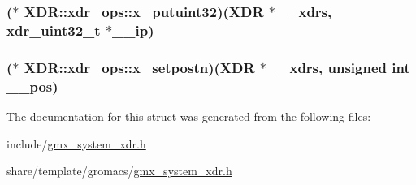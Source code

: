\hypertarget{structXDR_1_1xdr__ops_a5217c37546df602c7707342faa2e8eef}{
\subsubsection[{x\-\_\-putuint32}]{($\ast$ {\bf \-X\-D\-R\-::xdr\-\_\-ops\-::x\-\_\-putuint32})({\bf \-X\-D\-R} $\ast$\-\_\-\-\_\-xdrs, xdr\-\_\-uint32\-\_\-t $\ast$\-\_\-\-\_\-ip)}}\label{structXDR_1_1xdr__ops_a5217c37546df602c7707342faa2e8eef}
\hypertarget{structXDR_1_1xdr__ops_ae605d84932d289b354d0c841b88ab8d8}{
\subsubsection[{x\-\_\-setpostn}]{($\ast$ {\bf \-X\-D\-R\-::xdr\-\_\-ops\-::x\-\_\-setpostn})({\bf \-X\-D\-R} $\ast$\-\_\-\-\_\-xdrs, unsigned int \-\_\-\-\_\-pos)}}\label{structXDR_1_1xdr__ops_ae605d84932d289b354d0c841b88ab8d8}


\-The documentation for this struct was generated from the following files\-:\begin{DoxyCompactItemize}
\item 
include/\hyperlink{include_2gmx__system__xdr_8h}{gmx\-\_\-system\-\_\-xdr.\-h}\item 
share/template/gromacs/\hyperlink{share_2template_2gromacs_2gmx__system__xdr_8h}{gmx\-\_\-system\-\_\-xdr.\-h}\end{DoxyCompactItemize}
